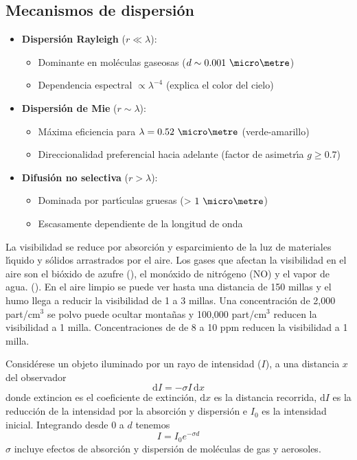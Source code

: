 \subsection{Mecanismos de dispersi\'on}\label{mddis}
\begin{itemize}
    \item \textbf{Dispersi\'on Rayleigh} ($r \ll \lambda$):
    \begin{itemize}
        \item Dominante en mol\'eculas gaseosas ($d \sim 0.001\ \micro\metre$)
        \item Dependencia espectral $\propto \lambda^{-4}$ (explica el color del cielo)
    \end{itemize}
    
    \item \textbf{Dispersi\'on de Mie} ($r \sim \lambda$):
    \begin{itemize}
        \item M\'axima eficiencia para $\lambda = 0.52\ \micro\metre$ (verde-amarillo)
        \item Direccionalidad preferencial hacia adelante (factor de asimetr\'{\i}a $g \geq 0.7$)
    \end{itemize}
    
    \item \textbf{Difusi\'on no selectiva} ($r > \lambda$):
    \begin{itemize}
        \item Dominada por part\'{\i}culas gruesas (> $1\ \micro\metre$)
        \item Escasamente dependiente de la longitud de onda
    \end{itemize}
\end{itemize}

La visibilidad se reduce por absorci\'on y esparcimiento de la luz de  materiales l\'{\i}quido y s\'olidos arrastrados por el aire. Los gases que afectan la visibilidad en el aire son el bi\'oxido de azufre (), el mon\'oxido de nitr\'ogeno (NO) y el vapor de agua. (). En el aire limpio se puede ver hasta una distancia de 150 millas y el humo llega a reducir la visibilidad de 1 a 3 millas. Una concentraci\'on de 2,000 part/cm$^3$ se polvo puede ocultar monta\~nas y 100,000 part/cm$^3$ reducen la visibilidad a 1 milla. Concentraciones de  de 8 a 10 ppm reducen la visibilidad a 1 milla.

Consid\'erese un objeto iluminado por un rayo de intensidad ($I$), a una distancia $x$ del observador
\begin{equation}
\mathrm{d}I=-\sigma I\, \mathrm{d}x
\end{equation}
donde \gls{extincion} es el coeficiente de extinci\'on, $\mathrm{d}x$ es la distancia recorrida, $\mathrm{d}I$ es la reducci\'on de la intensidad por la absorci\'on y dispersi\'on e $I_0$ es la intensidad inicial. Integrando desde 0 a $d$ tenemos
\begin{equation}
I =I_0 e^{-\sigma d}
\end{equation}
$\sigma$ incluye efectos de absorci\'on y dispersi\'on de mol\'eculas de gas y aerosoles.

